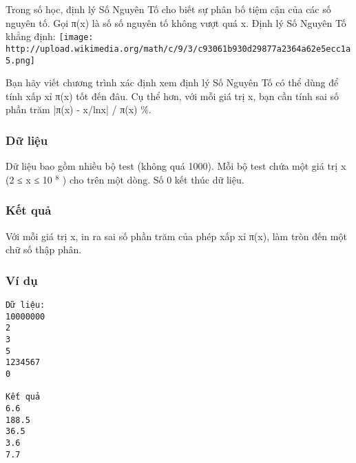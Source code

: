 



   Trong số học, định lý Số Nguyên Tố cho biết sự phân bố tiệm cận của các số nguyên tố. Gọi π(x) là số số nguyên tố không vượt quá x. Định lý Số Nguyên Tố khẳng định:  
\texttt{[image: http://upload.wikimedia.org/math/c/9/3/c93061b930d29877a2364a62e5ecc1a5.png]}

   Bạn hãy viết chương trình xác định xem định lý Số Nguyên Tố có thể dùng để tính xấp xỉ π(x) tốt đến đâu. Cụ thể hơn, với mỗi giá trị x, bạn cần tính sai số phần trăm |π(x) - x/lnx| / π(x) \%.  

\subsubsection{   Dữ liệu  }

   Dữ liệu bao gồm nhiều bộ test (không quá 1000). Mỗi bộ test chứa một giá trị x (2 ≤ x ≤ 10   $^    8   $   ) cho trên một dòng. Số 0 kết thúc dữ liệu.  

\subsubsection{   Kết quả  }

   Với mỗi giá trị x, in ra sai số phần trăm của phép xấp xỉ π(x), làm tròn đến một chữ số thập phân.  

\subsubsection{   Ví dụ  }
\begin{verbatim}
Dữ liệu:
10000000
2
3
5
1234567
0

Kết quả
6.6
188.5
36.5
3.6
7.7
\end{verbatim}